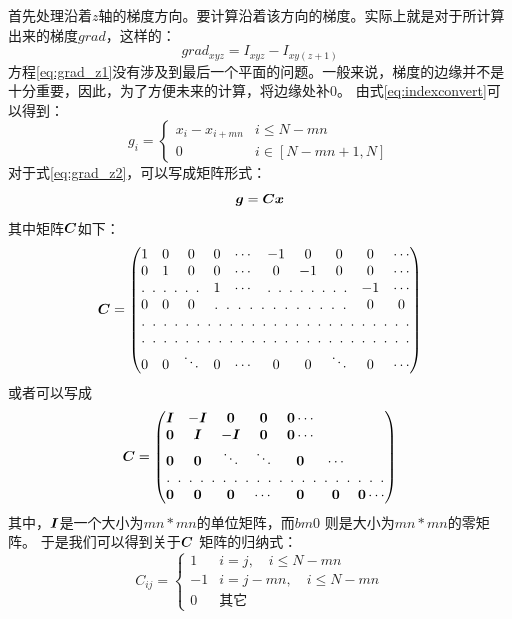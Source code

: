 首先处理沿着$z$轴的梯度方向。要计算沿着该方向的梯度。实际上就是对于所计算出来的梯度$grad$，这样的：
\begin{equation}\label{eq:grad_z1}
grad_{xyz} = I_{xyz}-I_{xy(z+1)} 
\end{equation}
方程\eqref{eq:grad_z1}没有涉及到最后一个平面的问题。一般来说，梯度的边缘并不是十分重要，因此，为了方便未来的计算，将边缘处补$0$。
由式\eqref{eq:indexconvert}可以得到：
\begin{equation}\label{eq:grad_z2}
g_i = \begin{cases}
        x_{i} - x_{i+mn} & i \le N-mn \\
        0   & i \in [N-mn+1,N]
        \end{cases}
\end{equation}
对于式\eqref{eq:grad_z2}，可以写成矩阵形式：
\begin{equation*}
\bm{g} = \bm{C} \bm{ x}
\end{equation*}
其中矩阵$\bm{C}$如下：
\begin{equation*}
\C = \begin{pmatrix}
1 & 0 & 0 & 0 & \cdots &-1 & 0 &0 &0 &\cdots \\
0 & 1 & 0 & 0 &\cdots &0 & -1 &0 &0 &\cdots \\
\hdotsfor[3]{3}& 1& \cdots &\hdotsfor[3]{3}&-1&\cdots \\
0 & 0 & 0 & \hdotsfor[3]{5}&0&0 \\
\hdotsfor[3]{10}\\
\hdotsfor[3]{10}\\
0 & 0 & \ddots & 0 & \cdots & 0 & 0 & \ddots & 0& \cdots 
\end{pmatrix}
\end{equation*}
或者可以写成
\begin{equation*}
\C = \begin{pmatrix}
\bI &  -\bI & \0 & \0 & \0 \cdots \\
\0 & \bI &  -\bI & \0 & \0 \cdots \\
\0 & \0  & \ddots & \ddots & \0 & \cdots \\
\hdotsfor[3]{7} \\
\0 & \0 & \0 &\cdots & \0 & \0 &\0 \cdots
\end{pmatrix}
\end{equation*}
其中，$\bm{I}$是一个大小为$mn * mn$的单位矩阵，而$bm 0$ 则是大小为$mn * mn$的零矩阵。
于是我们可以得到关于$\bm{C}$ 矩阵的归纳式：
\begin{equation}\label{eq:C}
C_{ij} = \begin{cases}
1 & i = j,\quad i\le N-mn \\
-1 & i = j- mn,\quad i\le N- mn \\
0 & \text{其它}
\end{cases}
\end{equation}

